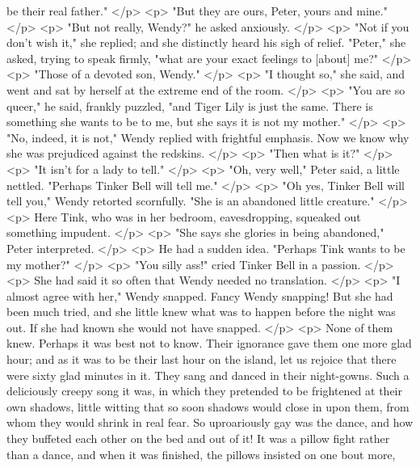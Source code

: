       be their real father."
    </p>
    <p>
      "But they are ours, Peter, yours and mine."
    </p>
    <p>
      "But not really, Wendy?" he asked anxiously.
    </p>
    <p>
      "Not if you don't wish it," she replied; and she distinctly heard his sigh
      of relief. "Peter," she asked, trying to speak firmly, "what are your
      exact feelings to [about] me?"
    </p>
    <p>
      "Those of a devoted son, Wendy."
    </p>
    <p>
      "I thought so," she said, and went and sat by herself at the extreme end
      of the room.
    </p>
    <p>
      "You are so queer," he said, frankly puzzled, "and Tiger Lily is just the
      same. There is something she wants to be to me, but she says it is not my
      mother."
    </p>
    <p>
      "No, indeed, it is not," Wendy replied with frightful emphasis. Now we
      know why she was prejudiced against the redskins.
    </p>
    <p>
      "Then what is it?"
    </p>
    <p>
      "It isn't for a lady to tell."
    </p>
    <p>
      "Oh, very well," Peter said, a little nettled. "Perhaps Tinker Bell will
      tell me."
    </p>
    <p>
      "Oh yes, Tinker Bell will tell you," Wendy retorted scornfully. "She is an
      abandoned little creature."
    </p>
    <p>
      Here Tink, who was in her bedroom, eavesdropping, squeaked out something
      impudent.
    </p>
    <p>
      "She says she glories in being abandoned," Peter interpreted.
    </p>
    <p>
      He had a sudden idea. "Perhaps Tink wants to be my mother?"
    </p>
    <p>
      "You silly ass!" cried Tinker Bell in a passion.
    </p>
    <p>
      She had said it so often that Wendy needed no translation.
    </p>
    <p>
      "I almost agree with her," Wendy snapped. Fancy Wendy snapping! But she
      had been much tried, and she little knew what was to happen before the
      night was out. If she had known she would not have snapped.
    </p>
    <p>
      None of them knew. Perhaps it was best not to know. Their ignorance gave
      them one more glad hour; and as it was to be their last hour on the
      island, let us rejoice that there were sixty glad minutes in it. They sang
      and danced in their night-gowns. Such a deliciously creepy song it was, in
      which they pretended to be frightened at their own shadows, little witting
      that so soon shadows would close in upon them, from whom they would shrink
      in real fear. So uproariously gay was the dance, and how they buffeted
      each other on the bed and out of it! It was a pillow fight rather than a
      dance, and when it was finished, the pillows insisted on one bout more,
